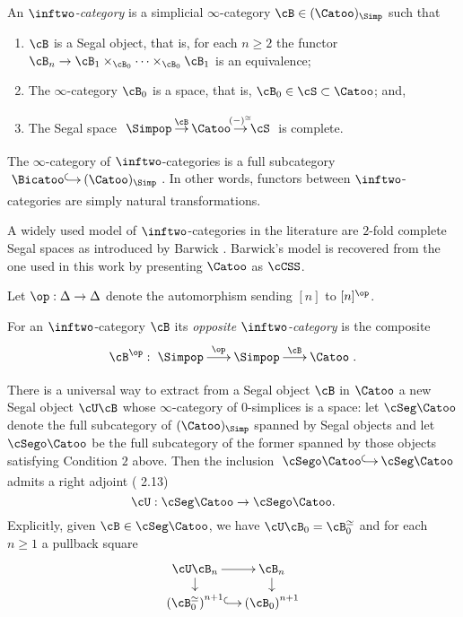 \documentclass[a4paper]{article}
\numberwithin{equation}{section}
\begin{document}
\begin{defn}
 An {\em $\inftwo$-category} is a simplicial $\infty$-category $\cB \in (\Catoo)_\Simp$ such that
 \begin{enumerate}
  \item $\cB$ is a Segal object, that is, for each $n\geq 2$ the functor $\cB_n \to \cB_1 \times_{\cB_0}\cdots \times_{\cB_0} \cB_1$ is an equivalence;
  \item The $\infty$-category $\cB_0$ is a space, that is, $\cB_0 \in \cS \subset \Catoo$; and,
  \item The Segal space $\xymatrixcolsep{.8pc}\xymatrix{ \Simpop \ar[r]^-\cB & \Catoo \ar[r]^-{(-)^\simeq} & \cS}$ is complete.
 \end{enumerate}
\end{defn}
The $\infty$-category of $\inftwo$-categories is a full subcategory $\xymatrixcolsep{.8pc}\xymatrix{ \Bicatoo \ar@{^{(}->}[r] & (\Catoo)_\Simp}$. In other words, functors between $\inftwo$-categories are simply natural transformations.
 
 \begin{remark}
A widely used model of $\inftwo$-categories in the literature are $2$-fold complete Segal spaces as introduced by Barwick \cite{BarwickThesis}. Barwick's model is recovered from the one used in this work by presenting $\Catoo$ as $\cCSS$.  
 \end{remark}
 
 

Let $\op: \Delta \to \Delta$ denote the automorphism sending $[n]$ to $[n]^\op$.
\begin{defn}
 For an $\inftwo$-category $\cB$ its {\em opposite $\inftwo$-category} is the composite
 \begin{equation*}
  \cB^\op: \xymatrixcolsep{1.5pc} \xymatrix{\Simpop \ar[r]^-\op & \Simpop \ar[r]^-\cB & \Catoo}.
 \end{equation*}
\end{defn}


 There is a universal way to extract from a Segal object $\cB$ in $\Catoo$ a new Segal object $\cU \cB$ whose $\infty$-category of $0$-simplices is a space: let $\cSeg \Catoo$ denote the full subcategory of $(\Catoo)_\Simp$ spanned by Segal objects and let $\cSego \Catoo$ be the full subcategory of the former spanned by those objects satisfying Condition $2$ above. Then the inclusion $\xymatrixcolsep{.8pc}\xymatrix{\cSego \Catoo \ar@{^{(}->}[r] & \cSeg \Catoo}$ admits a right adjoint (\cite{RuneSpans} 2.13)
 \begin{equation*}
 \cU:\cSeg \Catoo \to \cSego \Catoo. 
 \end{equation*}
 Explicitly, given $\cB \in \cSeg \Catoo$, we have $\cU \cB_0 = \cB_0^{\simeq}$ and for each $n\geq 1$ a pullback square
 \begin{equation}
 \label{LocPB}
  \xymatrixrowsep{.9pc}\xymatrixcolsep{.9pc}\xymatrix{\cU \cB_n \ar[r] \ar[d] & \cB_n \ar[d] \\
  \left(\cB_0^\simeq\right)^{n+1} \ar@{^{(}->}[r] & \left( \cB_0\right)^{n+1} }
 \end{equation}
\end{document}
